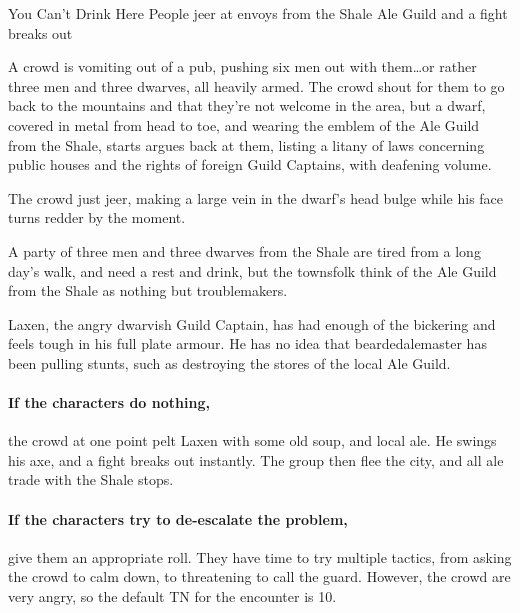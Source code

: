 \begin{multicols}{2}
{You Can't Drink Here}%
{People jeer at envoys from the Shale Ale Guild and a fight breaks out}%

\begin{boxtext}

	A crowd is vomiting out of a pub, pushing six men out with them\ldots or rather three men and three dwarves, all heavily armed.
	The crowd shout for them to go back to the mountains and that they're not welcome in the area, but a dwarf, covered in metal from head to toe, and wearing the emblem of the Ale Guild from the Shale, starts argues back at them, listing a litany of laws concerning public houses and the rights of foreign Guild Captains, with deafening volume.

	The crowd just jeer, making a large vein in the dwarf's head bulge while his face turns redder by the moment.

\end{boxtext}

A party of three men and three dwarves from the Shale are tired from a long day's walk, and need a rest and drink, but the townsfolk think of the Ale Guild from the Shale as nothing but troublemakers.

Laxen, the angry dwarvish Guild Captain, has had enough of the bickering and feels tough in his full plate armour.
He has no idea that \gls{beardedalemaster} has been pulling stunts, such as destroying the stores of the local Ale Guild.

\paragraph{If the characters do nothing,}
the crowd at one point pelt Laxen with some old soup, and local ale.
He swings his axe, and a fight breaks out instantly.
The group then flee the city, and all ale trade with the Shale stops.

\paragraph{If the characters try to de-escalate the problem,}
give them an appropriate roll.
They have time to try multiple tactics, from asking the crowd to calm down, to threatening to call the guard.
However, the crowd are very angry, so the default TN for the encounter is 10.




\end{multicols}
